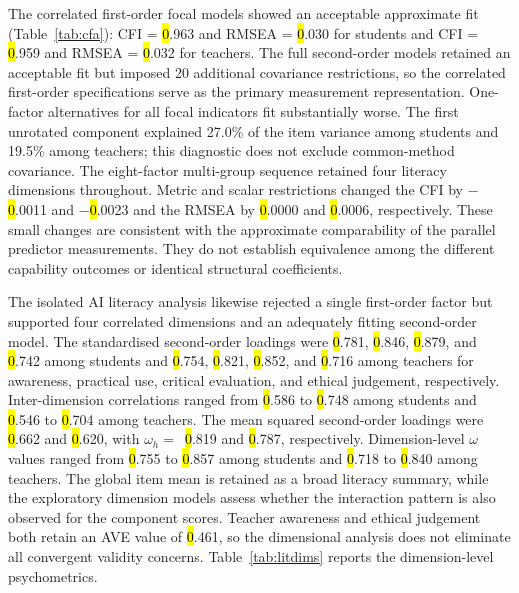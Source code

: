 \documentclass[sustainability,article,accept,moreauthors]{Definitions/mdpi}
\begin{document}
The correlated first-order focal models showed an acceptable approximate fit (Table~\ref{tab:cfa}): CFI = \hl{0}.963 and RMSEA = \hl{0}.030 for students and CFI = \hl{0}.959 and RMSEA = \hl{0}.032 for teachers. The full second-order models retained an acceptable fit but imposed 20 additional covariance restrictions, so the correlated first-order specifications serve as the primary measurement representation. One-factor alternatives for all focal indicators fit substantially worse. The first unrotated component explained 27.0\% of the item variance among students and 19.5\% among teachers; this diagnostic does not exclude common-method covariance. The eight-factor multi-group sequence retained four literacy dimensions throughout. Metric and scalar restrictions changed the CFI by $-$\hl{0}.0011 and $-$\hl{0}.0023 and the RMSEA by \hl{0}.0000 and \hl{0}.0006, respectively. These small changes are consistent with the approximate comparability of the parallel predictor measurements. They do not establish equivalence among the different capability outcomes or identical structural coefficients.

The isolated AI literacy analysis likewise rejected a single first-order factor but supported four correlated dimensions and an adequately fitting second-order model. The standardised second-order loadings were \hl{0}.781, \hl{0}.846, \hl{0}.879, and \hl{0}.742 among students and \hl{0}.754, \hl{0}.821, \hl{0}.852, and \hl{0}.716 among teachers for awareness, practical use, critical evaluation, and ethical judgement, respectively. Inter-dimension correlations ranged from \hl{0}.586 to \hl{0}.748 among students and \hl{0}.546 to \hl{0}.704 among teachers. The mean squared second-order loadings were \hl{0}.662 and \hl{0}.620, with $\omega_h=$~\hl{0}.819 and \hl{0}.787, respectively. Dimension-level $\omega$ values ranged from \hl{0}.755 to \hl{0}.857 among students and \hl{0}.718 to \hl{0}.840 among teachers. The global item mean is retained as a broad literacy summary, while the exploratory dimension models assess whether the interaction pattern is also observed for the component scores. Teacher awareness and ethical judgement both retain an AVE value of \hl{0}.461, so the dimensional analysis does not eliminate all convergent validity concerns. Table~\ref{tab:litdims} reports the dimension-level psychometrics.
\end{document}

